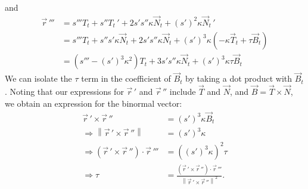 \documentclass{article}
\theoremstyle{definition}
\begin{document}
and
\begin{align*}
	\vec r\,'''&=s'''T_t+s''T_t\,'+2s's''\kappa \vec N_t+(s')^2\kappa \vec N_t\,'\\
	&=s'''T_t+s''s'\kappa \vec N_t+2s's''\kappa \vec N_t+(s')^3\kappa(-\kappa \vec T_t+\tau\vec B_t)\\
	&=(s'''-(s')^3\kappa^2)T_t+3s's''\kappa\vec N_t+(s')^3\kappa\tau\vec B_t
\end{align*}
We can isolate the $\tau$ term in the coefficient of $\vec B_t$ by taking a dot product with $\vec B_t$. Noting that our expressions for $\vec r\,'$ and $\vec r\,''$ include $\vec T$ and $\vec N$, and $\vec B=\vec T\times\vec N$, we obtain an expression for the binormal vector:
\begin{align*}
	\vec r\,'\times\vec r\,''&=(s')^3\kappa\vec B_t\\
	\Rightarrow\left\lVert\vec r\,'\times\vec r\,''\right\rVert&=(s')^3\kappa\\
	\Rightarrow(\vec r\,'\times\vec r\,'')\cdot\vec r\,'''&=((s')^3\kappa)^2\tau\\
	\Rightarrow\tau&=\frac{(\vec r\,'\times\vec r\,'')\cdot\vec r\,'''}{\left\lVert\vec r\,'\times\vec r\,''\right\rVert^2}.
\end{align*}

\newpage
\end{document}
